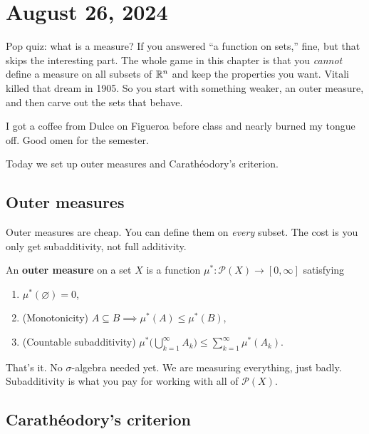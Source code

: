 

\section{August 26, 2024}\label{sec:lec1}

Pop quiz: what is a measure? If you answered ``a function on sets,'' fine, but that skips the interesting part. The whole game in this chapter is that you \emph{cannot} define a measure on all subsets of $\mathbb{R}^n$ and keep the properties you want. Vitali killed that dream in 1905. So you start with something weaker, an outer measure, and then carve out the sets that behave.

I got a coffee from Dulce on Figueroa before class and nearly burned my tongue off. Good omen for the semester.

Today we set up outer measures and Carath\'eodory's criterion.

\subsection{Outer measures}\label{subsec:outer-measures}

Outer measures are cheap. You can define them on
\emph{every} subset. The cost is you only get subadditivity, not
full additivity.

\begin{definition}\label{def:outer-measure}
An \textbf{outer measure} on a set $X$ is a function
$\mu^* \colon \mathcal{P}(X) \to [0,\infty]$ satisfying
\begin{enumerate}[nosep]
  \item $\mu^*(\varnothing) = 0$,
  \item (Monotonicity) $A \subseteq B \implies \mu^*(A) \le \mu^*(B)$,
  \item (Countable subadditivity)
        $\mu^*\!\bigl(\bigcup_{k=1}^\infty A_k\bigr)
        \le \sum_{k=1}^\infty \mu^*(A_k)$.
\end{enumerate}
\end{definition}

That's it. No $\sigma$-algebra needed yet. We are measuring everything, just
badly. Subadditivity is what you pay for working with all of
$\mathcal{P}(X)$.

\subsection{Carath\'eodory's criterion}\label{subsec:caratheodory}

